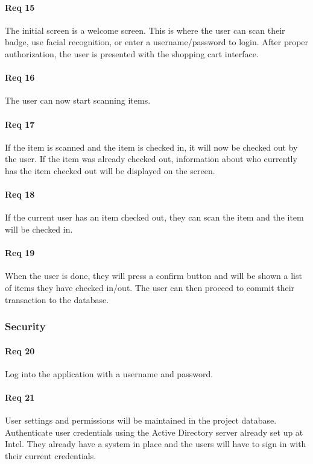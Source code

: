 \documentclass[10pt, onecolumn, twoside, peerreview]{IEEEtran}
\begin{document}
\paragraph*{Req 15} The initial screen is a welcome screen. This is where the user can scan their badge, use facial recognition, or enter a
username/password to login. After proper authorization, the user is presented with the shopping cart interface.\\

\paragraph*{Req 16} The user can now start scanning items.\\

\paragraph*{Req 17} If the item is scanned and the item is checked in, it will now be checked out by the user. If the item was already
checked out, information about who currently has the item checked out will be displayed on the screen.\\

\paragraph*{Req 18} If the current user has an item checked out, they can scan the item and the item will be checked in.\\

\paragraph*{Req 19} When the user is done, they will press a confirm button and will be shown a list of items they have checked in/out. The
user can then proceed to commit their transaction to the database.\\

\subsubsection{Security}
\paragraph*{Req 20} Log into the application with a username and password.\\

\paragraph*{Req 21} User settings and permissions will be maintained in the project database. Authenticate user credentials using the
Active Directory server already set up at Intel. They already have a system in place and the users will have to sign in
with their current credentials.\\
\end{document}
